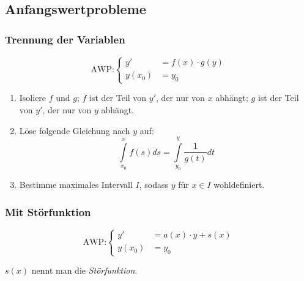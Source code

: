 \documentclass[a4paper, 16pt]{article}
\begin{document}
	\subsection{Anfangswertprobleme}

	\subsubsection{Trennung der Variablen}

	\begin{equation*}
		\textrm{AWP:}
		\begin{cases}
			y' &= f(x) \cdot g(y) \\
			y(x_0) &= y_0
		\end{cases}
	\end{equation*}

	\begin{enumerate}
		\item Isoliere $f$ und $g$; $f$ ist der Teil von $y'$, der nur von $x$ abhängt; $g$ ist der Teil von $y'$, der nur von $y$ abhängt.
		\item Löse folgende Gleichung nach $y$ auf:
			\begin{equation*}
				\int\limits_{x_0}^{x}{f(s)}ds = \int\limits_{y_0}^{y}{\frac{1}{g(t)}}dt
			\end{equation*}
		\item Bestimme maximales Intervall $I$, sodass $y$ für $x \in I$ wohldefiniert.
	\end{enumerate}

	\subsubsection{Mit Störfunktion}

	\begin{equation*}
		\textrm{AWP:}
		\begin{cases}
			y' &= a(x) \cdot y + s(x) \\
			y(x_0) &= y_0
		\end{cases}
	\end{equation*}

	$s(x)$ nennt man die \emph{Störfunktion}.
\end{document}
